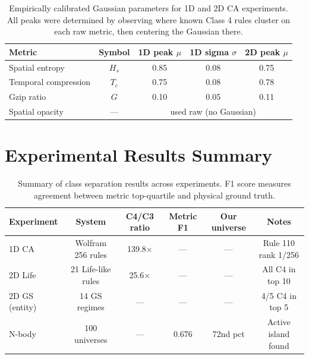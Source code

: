 \documentclass[12pt,a4paper]{article}
\begin{document}
\begin{table}[h]
\centering
\caption{Empirically calibrated Gaussian parameters for 1D and 2D CA experiments.
All peaks were determined by observing where known Class 4 rules cluster
on each raw metric, then centering the Gaussian there.}
\begin{tabular}{lcccc}
\toprule
Metric & Symbol & 1D peak $\mu$ & 1D sigma $\sigma$ & 2D peak $\mu$ \\
\midrule
Spatial entropy    & $H_s$   & 0.85 & 0.08 & 0.75 \\
Temporal compression & $T_c$ & 0.75 & 0.08 & 0.78 \\
Gzip ratio         & $G$     & 0.10 & 0.05 & 0.11 \\
Spatial opacity    & ---     & \multicolumn{3}{c}{used raw (no Gaussian)} \\
\bottomrule
\end{tabular}
\end{table}

\section{Experimental Results Summary}

\begin{table}[h]
\centering
\caption{Summary of class separation results across experiments.
F1 score measures agreement between metric top-quartile and physical ground truth.}
\begin{tabular}{lccccc}
\toprule
Experiment & System & C4/C3 ratio & Metric F1 & Our universe & Notes \\
\midrule
1D CA      & Wolfram 256 rules  & 139.8$\times$ & ---   & ---        & Rule 110 rank 1/256 \\
2D Life    & 21 Life-like rules & 25.6$\times$  & ---   & ---        & All C4 in top 10 \\
2D GS (entity) & 14 GS regimes & ---           & ---   & ---        & 4/5 C4 in top 5 \\
N-body     & 100 universes      & ---           & 0.676 & 72nd pct   & Active island found \\
\bottomrule
\end{tabular}
\end{table}

\end{document}
